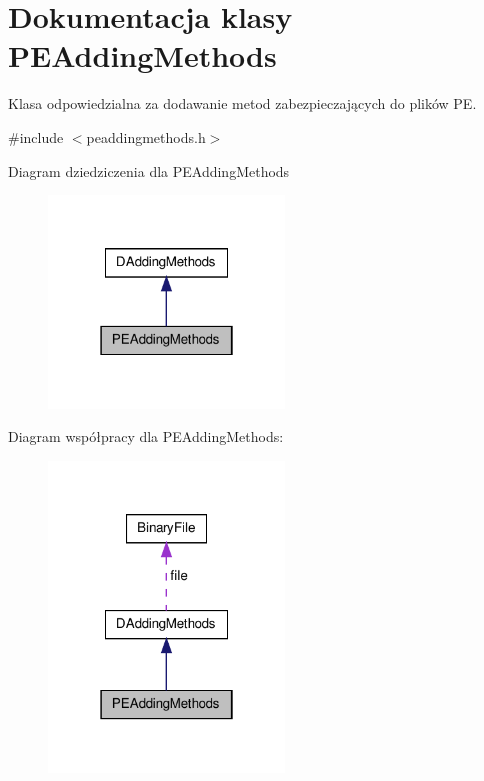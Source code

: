 \hypertarget{class_p_e_adding_methods}{\section{Dokumentacja klasy P\-E\-Adding\-Methods}
\label{class_p_e_adding_methods}
}


Klasa odpowiedzialna za dodawanie metod zabezpieczających do plików P\-E.  




{\ttfamily \#include $<$peaddingmethods.\-h$>$}



Diagram dziedziczenia dla P\-E\-Adding\-Methods\nopagebreak
\begin{figure}[H]
\begin{center}
\leavevmode
\includegraphics[width=178pt]{class_p_e_adding_methods__inherit__graph}
\end{center}
\end{figure}


Diagram współpracy dla P\-E\-Adding\-Methods\-:\nopagebreak
\begin{figure}[H]
\begin{center}
\leavevmode
\includegraphics[width=178pt]{class_p_e_adding_methods__coll__graph}
\end{center}
\end{figure}

